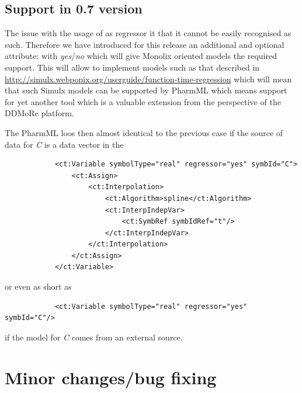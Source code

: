 \subsection{Support in 0.7 version}
The issue with the usage of  as regressor it that it cannot be 
easily recognised as such. Therefore we have introduced for this release 
an additional and optional attribute:  with \emph{yes}/\emph{no} 
which will give Monolix oriented models the required support. 
This will allow to implement models such as that described in
\url{http://simulx.webpopix.org/userguide/function-time-regression}
which will mean that such Simulx models can be supported by PharmML
which means support for yet another tool which is a valuable extension from the
perspective of the DDMoRe platform. 

The PharmML loos then almost identical to the previous case if the source of
data for \emph{C} is a data vector in the 
\lstset{language=XML}
\begin{lstlisting}
            <ct:Variable symbolType="real" regressor="yes" symbId="C">
                <ct:Assign>
                    <ct:Interpolation>
                        <ct:Algorithm>spline</ct:Algorithm>
                        <ct:InterpIndepVar>
                            <ct:SymbRef symbIdRef="t"/>
                        </ct:InterpIndepVar>
                    </ct:Interpolation>
                </ct:Assign>
            </ct:Variable>
\end{lstlisting}
or even as short as
\lstset{language=XML}
\begin{lstlisting}
            <ct:Variable symbolType="real" regressor="yes" symbId="C"/>
\end{lstlisting}
if the model for \emph{C} comes from an external source.

\section{Minor changes/bug fixing}
\label{sec:minorChanges}

